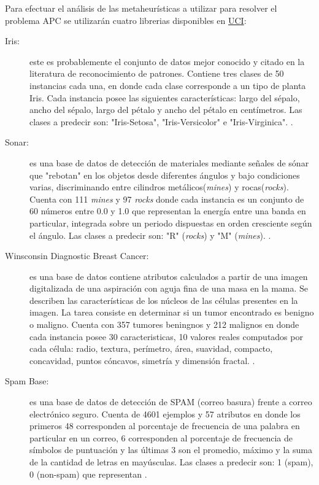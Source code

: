 \documentclass{ci5652}
\begin{document}
Para efectuar el análisis de las metaheurísticas a utilizar para resolver el
problema APC se utilizarán cuatro librerias disponibles en
\href{http://archive.ics.uci.edu/ml/index.php}{UCI}:

\begin{description}
  \item [Iris:] este es probablemente el conjunto de datos mejor conocido y citado
  en la literatura de reconocimiento de patrones. Contiene tres clases de 50
  instancias cada una, en donde cada clase corresponde a un tipo de planta Iris.
  Cada instancia posee las siguientes características: largo del sépalo, ancho
  del sépalo, largo del pétalo y ancho del pétalo en centímetros. Las clases a
  predecir son: "Iris-Setosa", "Iris-Versicolor" e "Iris-Virginica".
  \cite{UCI_Iris}.

  \item [Sonar:] es una base de datos de detección de materiales mediante señales
  de sónar que "rebotan" en los objetos desde diferentes ángulos y bajo
  condiciones varias, discriminando entre cilindros metálicos(\textit{mines}) y
  rocas(\textit{rocks}). Cuenta con 111 \textit{mines} y 97 \textit{rocks} donde
  cada instancia es un conjunto de 60 números entre 0.0 y 1.0 que representan la
  energía entre una banda en particular, integrada sobre un periodo dispuestas
  en orden cresciente según el ángulo. Las clases a predecir son: "R"
  (\textit{rocks}) y "M" (\textit{mines}). \cite{UCI_Sonar}.

  \item [Winsconsin Diagnostic Breast Cancer:] es una base de datos contiene
  atributos calculados a partir de una imagen digitalizada de una aspiración con
  aguja fina de una masa en la mama. Se describen las características de los
  núcleos de las células presentes en la imagen. La tarea consiste en determinar
  si un tumor encontrado es benigno o maligno. Cuenta con 357 tumores beningnos
  y 212 malignos en donde cada instancia posee 30 caracteristicas, 10 valores
  reales computados por cada célula: radio, textura, perímetro, área, suavidad,
  compacto, concavidad, puntos cóncavos, simetría y dimensión fractal.
  \cite{UCI_WDBC}.

  \item [Spam Base:] es una base de datos de detección de SPAM (correo basura)
  frente a correo electrónico seguro. Cuenta de 4601 ejemplos y 57 atributos en
  donde los primeros 48 corresponden al porcentaje de frecuencia de una palabra
  en particular en un correo, 6 corresponden al porcentaje de frecuencia de
  símbolos de puntuación y las últimas 3 son el promedio, máximo y la suma de la
  cantidad de letras en mayúsculas. Las clases a predecir son: 1 (spam), 0
  (non-spam) que representan \cite{UCI_SpamBase}.

\end{description}
\end{document}
